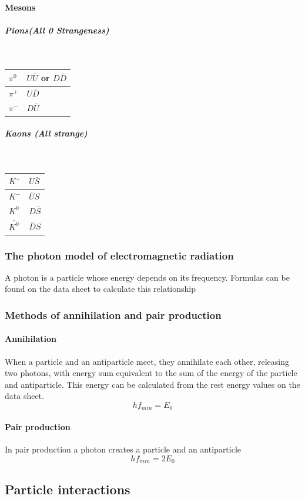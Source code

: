 \documentclass[12pt]{article}
\begin{document}
\paragraph{Mesons}
\subparagraph{Pions(All 0 Strangeness)}
$ $\\
{\def\arraystretch{1.5}
\begin{tabularx}{\textwidth}{|X|X|}
\hline
$\pi^0$&$U\bar{U}$ or $D\bar{D}$\\
\hline
$\pi^+$&$U\bar{D}$\\
\hline
$\pi^-$&$D\bar{U}$\\
\hline
\end{tabularx}}
\subparagraph{Kaons (All strange)}
$ $\\
{\def\arraystretch{1.5}
\begin{tabularx}{\textwidth}{|X|X|}
\hline
$K^+$&$U\bar{S}$\\
\hline
$K^-$&$\bar{U}S$\\
\hline
$K^0$&$D\bar{S}$\\
\hline
$\bar{K^0}$&$\bar{D}S$\\
\hline
\end{tabularx}}
\subsubsection{The photon model of electromagnetic radiation}
A photon is a particle whose energy depends on its frequency. Formulas can be found on the data sheet to calculate this relationship
\subsubsection{Methods of annihilation and pair production}
\paragraph{Annihilation}
When a particle and an antiparticle meet, they annihilate each other, releasing two photons, with energy sum equivalent to the sum of the energy of the particle and antiparticle. This energy can be calculated from the rest energy values on the data sheet.
$$hf_{min}=E_0$$
\paragraph{Pair production}
In pair production a photon creates a particle and an antiparticle
$$hf_{min}=2E_0$$
\subsection{Particle interactions}
\end{document}
